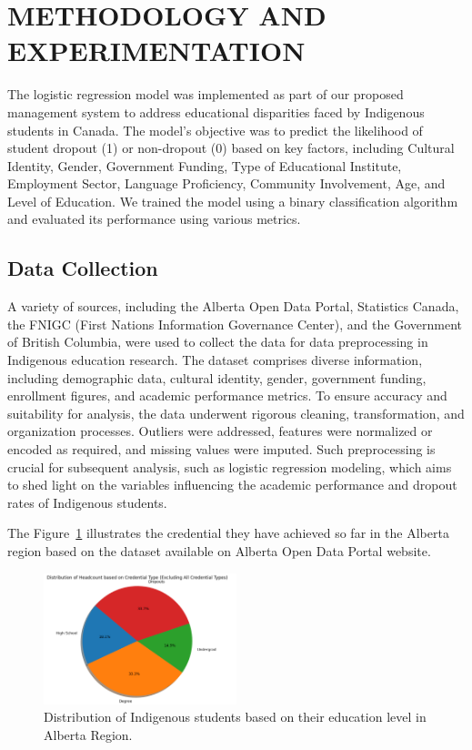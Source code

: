 \documentclass[a4paper,twoside]{article}
\begin{document}
\section{\uppercase{Methodology and Experimentation}}
\label{sec:Results}
The logistic regression model was implemented as part of our proposed management system to address educational disparities faced by Indigenous students in Canada. The model's objective was to predict the likelihood of student dropout (1) or non-dropout (0) based on key factors, including Cultural Identity, Gender, Government Funding, Type of Educational Institute, Employment Sector, Language Proficiency, Community Involvement, Age, and Level of Education. We trained the model using a binary classification algorithm and evaluated its performance using various metrics.

\subsection{Data Collection}

A variety of sources, including the Alberta Open Data Portal, Statistics Canada, the FNIGC (First Nations Information Governance Center), and the Government of British Columbia, were used to collect the data for data preprocessing in Indigenous education research. The dataset comprises diverse information, including demographic data, cultural identity, gender, government funding, enrollment figures, and academic performance metrics. To ensure accuracy and suitability for analysis, the data underwent rigorous cleaning, transformation, and organization processes. Outliers were addressed, features were normalized or encoded as required, and missing values were imputed. Such preprocessing is crucial for subsequent analysis, such as logistic regression modeling, which aims to shed light on the variables influencing the academic performance and dropout rates of Indigenous students.


The Figure~\ref{fig:datacollection} illustrates the credential they have achieved so far in the Alberta region based on the dataset available on Alberta Open Data Portal website.
 \begin{figure}[H]
    \centering 
    \includegraphics[width=0.5\textwidth, angle=0]{images/DataCollection.png}	
    \captionsetup{format=plain, justification=centering}
    \caption{Distribution of Indigenous students based on their education level in Alberta Region.}
    \label{fig:datacollection}
\end{figure}
\end{document}
